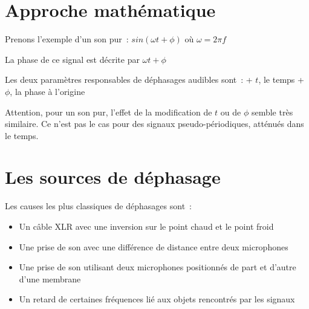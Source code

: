 \documentclass[
]{book}
\providecommand{\tightlist}{%
  \setlength{\itemsep}{0pt}\setlength{\parskip}{0pt}}
\begin{document}
\hypertarget{approche-mathuxe9matique}{%
\section{Approche mathématique}\label{approche-mathuxe9matique}}

Prenons l'exemple d'un son pur~:
\(sin (\omega t + \phi)\) où \(\omega = 2\pi f\)

La phase de ce signal est décrite par \(\omega t +\phi\)

Les deux paramètres responsables de déphasages audibles sont~:
+ \(t\), le temps
+ \(\phi\), la phase à l'origine

Attention, pour un son pur, l'effet de la modification de \(t\) ou de \(\phi\) semble très similaire. Ce n'est pas le cas pour des signaux pseudo-périodiques, atténués dans le temps.

\hypertarget{les-sources-de-duxe9phasage}{%
\section{Les sources de déphasage}\label{les-sources-de-duxe9phasage}}

Les causes les plus classiques de déphasages sont~:

\begin{itemize}
\tightlist
\item
  Un câble XLR avec une inversion sur le point chaud et le point froid
\item
  Une prise de son avec une différence de distance entre deux microphones
\item
  Une prise de son utilisant deux microphones positionnés de part et d'autre d'une membrane
\item
  Un retard de certaines fréquences lié aux objets rencontrés par les signaux
\end{itemize}
\end{document}
